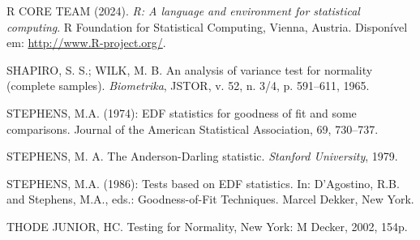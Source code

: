 \documentclass[a4paper,11pt]{article} %
\begin{document}
\begin{flushleft}
\noindent R CORE TEAM (2024). {\it R: A language and environment for statistical computing}. R Foundation for Statistical Computing, Vienna, Austria. Disponível em: \url{http://www.R-project.org/}.\newline

\noindent SHAPIRO, S. S.; WILK, M. B. An analysis of variance test for normality (complete samples). {\it Biometrika}, JSTOR, v. 52, n. 3/4, p. 591–611, 1965.\newline

\noindent STEPHENS, M.A. (1974): EDF statistics for goodness of fit and some comparisons. Journal of the American Statistical Association, 69, 730–737.\newline
    
\noindent STEPHENS, M. A. The Anderson-Darling statistic. {\it Stanford University}, 1979.\newline

\noindent STEPHENS, M.A. (1986): Tests based on EDF statistics. In: D’Agostino, R.B. and Stephens, M.A., eds.: Goodness-of-Fit Techniques. Marcel Dekker, New York.\newline

\noindent THODE JUNIOR, HC. Testing for Normality, New York: M Decker, 2002, 154p.


\end{flushleft}

	
	
	
\end{document}
